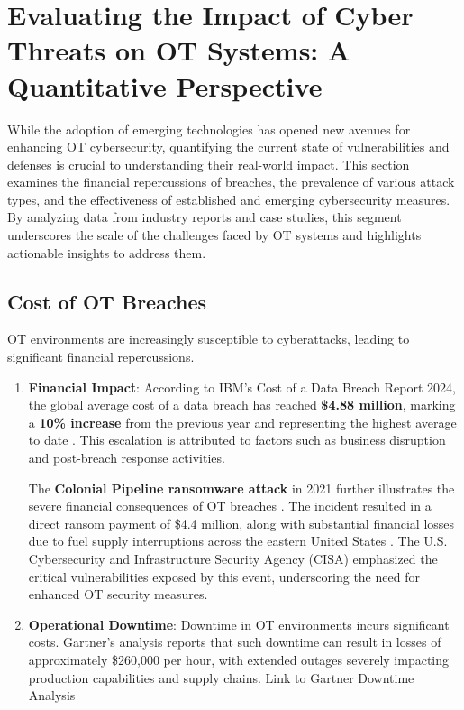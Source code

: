 \section{Evaluating the Impact of Cyber Threats on OT Systems: A Quantitative Perspective}
\label{sec:EmergingTrends}

While the adoption of emerging technologies has opened new avenues for enhancing OT cybersecurity, quantifying the current state of vulnerabilities and defenses is crucial to understanding their real-world impact. This section examines the financial repercussions of breaches, the prevalence of various attack types, and the effectiveness of established and emerging cybersecurity measures. By analyzing data from industry reports and case studies, this segment underscores the scale of the challenges faced by OT systems and highlights actionable insights to address them.

\subsection {Cost of OT Breaches} 
OT environments are increasingly susceptible to cyberattacks, leading to significant financial repercussions.

\begin{enumerate}
    \item \textbf{Financial Impact}: According to IBM's Cost of a Data Breach Report 2024, the global average cost of a data breach has reached \textbf{\$4.88 million}, marking a \textbf{10\% increase} from the previous year and representing the highest average to date \cite{IBM}. This escalation is attributed to factors such as business disruption and post-breach response activities.

    The \textbf{Colonial Pipeline ransomware attack} in 2021 further illustrates the severe financial consequences of OT breaches \cite{cisa}. The incident resulted in a direct ransom payment of \$4.4 million, along with substantial financial losses due to fuel supply interruptions across the eastern United States \cite{TheGuardian}. The U.S. Cybersecurity and Infrastructure Security Agency (CISA) emphasized the critical vulnerabilities exposed by this event, underscoring the need for enhanced OT security measures.

    \item \textbf{Operational Downtime}: Downtime in OT environments incurs significant costs. Gartner’s analysis reports that such downtime can result in losses of approximately \$260,000 per hour, with extended outages severely impacting production capabilities and supply chains.
Link to Gartner Downtime Analysis
\end{enumerate}
